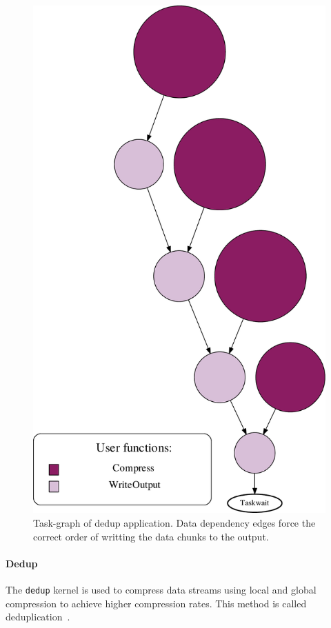 {\begin{figure}[t!]%
	\center
	\includegraphics[width=.4\columnwidth]{ifcg/figures/dedup_taskgraph}%
	\caption{Task-graph of dedup application.  Data dependency edges force the correct order
of writting the data chunks to the output.}
	\label{fig:dedup_tg}%
	\vspace{.5cm}
\end{figure}


\paragraph{\textbf{Dedup}}
The \texttt{dedup} kernel is used to compress data streams using local and global
compression to achieve higher compression rates.  This method is called
deduplication~\cite{Quinlan:2002:ABP:1083323.1083333}.

}
